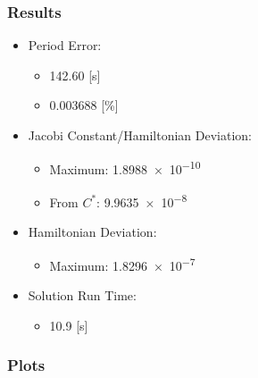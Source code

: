 \documentclass{article}
\begin{document}
\subsubsection{Results}

\begin{itemize}
    \item Period Error:
    \begin{itemize}
        \item 142.60 [s]
        \item 0.003688 [\%]
    \end{itemize}
    \item Jacobi Constant/Hamiltonian Deviation:
    \begin{itemize}
        \item Maximum: \num{1.8988e-10}
        \item From $C^*$: \num{9.9635e-8}
    \end{itemize}
    \item Hamiltonian Deviation:
    \begin{itemize}
        \item Maximum: \num{1.8296e-7}
    \end{itemize}
    \item Solution Run Time:
    \begin{itemize}
        \item 10.9 [s]
    \end{itemize}  
\end{itemize}

\newpage

\subsubsection{Plots}
\end{document}
